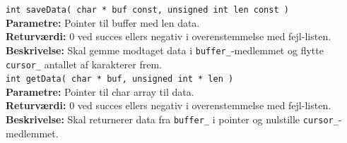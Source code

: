 \verb+int saveData( char * buf const, unsigned int len const )+ \\
\textbf{Parametre:} Pointer til buffer med len data. \\
\textbf{Returværdi:} 0 ved succes ellers negativ i overenstemmelse med fejl-listen. \\
\textbf{Beskrivelse:} Skal gemme modtaget data i \verb+buffer_+-medlemmet og flytte \verb+cursor_+ antallet af karakterer frem.\\

\verb+int getData( char * buf, unsigned int * len )+ \\
\textbf{Parametre:} Pointer til char array til data. \\
\textbf{Returværdi:} 0 ved succes ellers negativ i overenstemmelse med fejl-listen. \\
\textbf{Beskrivelse:} Skal returnerer data fra \verb+buffer_+ i pointer og nulstille \verb+cursor_+-medlemmet.\\